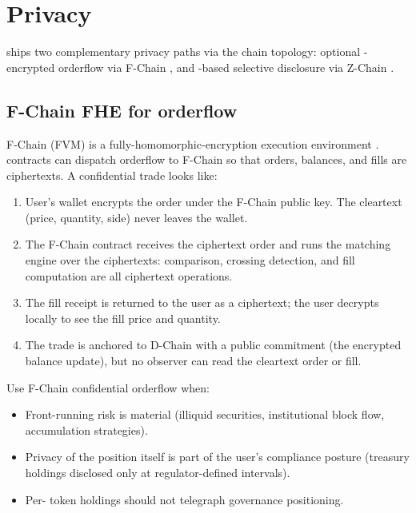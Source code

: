 \section{Privacy}
\label{sec:privacy}

\Zoo{} \DEX{} ships two complementary privacy paths via the \Lux{}
chain topology: optional \FHE{}-encrypted orderflow via F-Chain
\cite{lp-013}, and \ZKP{}-based selective disclosure via Z-Chain
\cite{lp-063}.

\subsection{F-Chain FHE for orderflow}

F-Chain (FVM) is a fully-homomorphic-encryption execution environment
\cite{lp-013}. \Zoo{} \DEX{} contracts can dispatch orderflow to
F-Chain so that orders, balances, and fills are ciphertexts. A
confidential trade looks like:

\begin{enumerate}[leftmargin=1.4em]
  \item User's wallet encrypts the order under the F-Chain public
        key. The cleartext (price, quantity, side) never leaves the
        wallet.
  \item The F-Chain contract receives the ciphertext order and runs
        the matching engine over the ciphertexts: comparison,
        crossing detection, and fill computation are all
        ciphertext operations.
  \item The fill receipt is returned to the user as a ciphertext;
        the user decrypts locally to see the fill price and quantity.
  \item The trade is anchored to D-Chain with a public commitment
        (the encrypted balance update), but no observer can read
        the cleartext order or fill.
\end{enumerate}

Use F-Chain confidential orderflow when:

\begin{itemize}[leftmargin=1.2em]
  \item Front-running risk is material (illiquid securities,
        institutional block flow, accumulation strategies).
  \item Privacy of the position itself is part of the user's
        compliance posture (treasury holdings disclosed only at
        regulator-defined intervals).
  \item Per-\LLM{} token holdings should not telegraph governance
        positioning.
\end{itemize}

